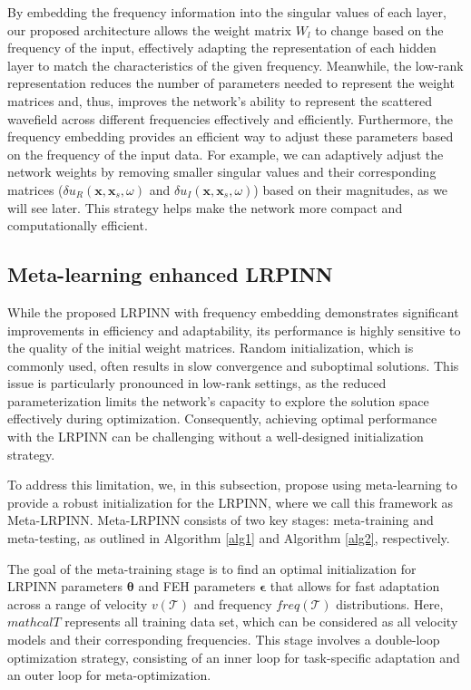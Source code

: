 By embedding the frequency information into the singular values of each layer, our proposed architecture allows the weight matrix $W_l$ to change based on the frequency of the input, effectively adapting the representation of each hidden layer to match the characteristics of the given frequency. Meanwhile, the low-rank representation reduces the number of parameters needed to represent the weight matrices and, thus, improves the network's ability to represent the scattered wavefield across different frequencies effectively and efficiently. Furthermore, the frequency embedding provides an efficient way to adjust these parameters based on the frequency of the input data. For example, we can adaptively adjust the network weights by removing smaller singular values and their corresponding matrices ($\delta u_R(\mathbf{x}, \mathbf{x}_s, \omega)$ and $\delta u_I(\mathbf{x}, \mathbf{x}_s, \omega)$) based on their magnitudes, as we will see later. This strategy helps make the network more compact and computationally efficient. 


\subsection{Meta-learning enhanced LRPINN}
While the proposed LRPINN with frequency embedding demonstrates significant improvements in efficiency and adaptability, its performance is highly sensitive to the quality of the initial weight matrices. Random initialization, which is commonly used, often results in slow convergence and suboptimal solutions. This issue is particularly pronounced in low-rank settings, as the reduced parameterization limits the network's capacity to explore the solution space effectively during optimization. Consequently, achieving optimal performance with the LRPINN can be challenging without a well-designed initialization strategy. 

To address this limitation, we, in this subsection, propose using meta-learning \citep{finn2017model} to provide a robust initialization for the LRPINN, where we call this framework as Meta-LRPINN. Meta-LRPINN consists of two key stages: meta-training and meta-testing, as outlined in Algorithm \ref{alg1} and Algorithm \ref{alg2}, respectively. 

The goal of the meta-training stage is to find an optimal initialization for LRPINN parameters $\boldsymbol{\theta}$ and FEH parameters $\boldsymbol{\epsilon}$ that allows for fast adaptation across a range of velocity $v(\mathcal{T})$ and frequency $\textit{freq}(\mathcal{T})$ distributions. Here, $mathcal{T}$ represents all training data set, which can be considered as all velocity models and their corresponding frequencies. This stage involves a double-loop optimization strategy, consisting of an inner loop for task-specific adaptation and an outer loop for meta-optimization. 

